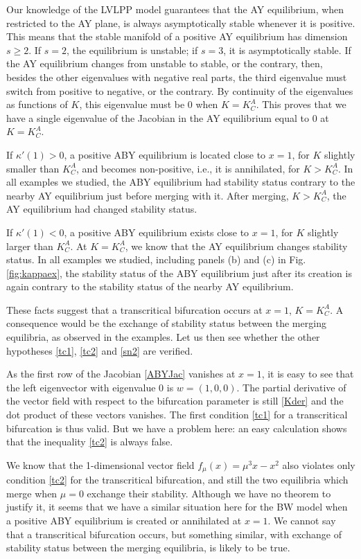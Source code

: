 \documentclass[12pt]{article}
\theoremstyle{definition}
\begin{document}
Our knowledge of the LVLPP model guarantees that the AY equilibrium, when restricted to the AY plane, is always asymptotically stable whenever it is positive. This means that the stable manifold of a positive AY equilibrium has dimension $s \geq 2$. If $s=2$, the equilibrium is unstable; if $s=3$, it is asymptotically stable. If the AY equilibrium changes from unstable to stable, or the contrary, then, besides the other eigenvalues with negative real parts, the third eigenvalue must switch from positive to negative, or the contrary. By continuity of the eigenvalues as functions of $K$, this eigenvalue must be 0 when $K=K^A_C$. This proves that we have a single eigenvalue of the Jacobian in the AY equilibrium equal to 0 at $K=K^A_C$.

If $\kappa'(1)>0$, a positive ABY equilibrium is located close to $x=1$, for $K$ slightly smaller than $K^A_C$, and becomes non-positive, i.e., it is annihilated, for $K>K^A_C$. In all examples we studied, the ABY equilibrium had stability status contrary to the nearby AY equilibrium just before merging with it. After merging, $K>K^A_C$, the AY equilibrium had changed stability status. 

If $\kappa'(1)<0$, a positive ABY equilibrium exists close to $x=1$, for $K$ slightly larger than $K^A_C$. At $K=K^A_C$, we know that the AY equilibrium changes stability status. In all examples we studied, including panels (b) and (c) in Fig. \ref{fig:kappaex}, the stability status of the ABY equilibrium just after its creation is again contrary to the stability status of the nearby AY equilibrium.

These facts suggest that a transcritical bifurcation occurs at $x=1$, $K=K^A_C$. A consequence would be the exchange of stability status between the merging equilibria, as observed in the examples. Let us then see whether the other hypotheses \eqref{tc1}, \eqref{tc2} and \eqref{sn2} are verified.

As the first row of the Jacobian \eqref{ABYJac} vanishes at $x=1$, it is easy to see that the left eigenvector with eigenvalue 0 is $w=(1,0,0)$. The partial derivative of the vector field with respect to the bifurcation parameter is still \eqref{Kder} and the dot product of these vectors vanishes. The first condition \eqref{tc1} for a transcritical bifurcation is thus valid. But we have a problem here: an easy calculation shows that the inequality \eqref{tc2} is always false.

We know that the 1-dimensional vector field $f_{\mu}(x)=\mu^3 x-x^2$ also violates only condition \eqref{tc2} for the transcritical bifurcation, and still the two equilibria which merge when $\mu=0$ exchange their stability. Although we have no theorem to justify it, it seems that we have a similar situation here for the BW model when a positive ABY equilibrium is created or annihilated at $x=1$. We cannot say that a transcritical bifurcation occurs, but something similar, with exchange of stability status between the merging equilibria, is likely to be true. 
\end{document}
